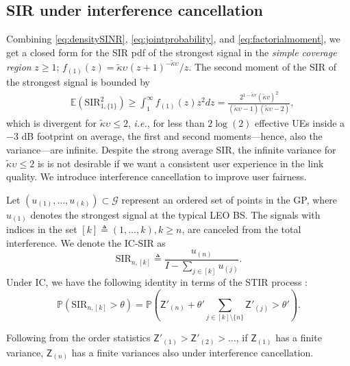 \documentclass[lettersize,journal]{IEEEtran}
\begin{document}
\subsection{SIR under interference cancellation}
Combining \eqref{eq:densitySINR}, \eqref{eq:jointprobability}, and \eqref{eq:factorialmoment}, we get a closed form for the SIR pdf of the strongest signal in the \textit{simple coverage region} $z\geq 1$; $f_{(1)}(z) =  {\tilde{\kappa}\upsilon_{}\left({z + 1} \right)^{-\tilde{\kappa}\upsilon_{}}}/{z}$. The second moment of the SIR of the strongest signal is bounded by
\begin{align}
  \label{eq:SIR2}
&\mathbb{E}(\text{SIR}^2_{1,\{1\}}) \geq \int_{1}^{\infty}f_{(1)}(z) z^2 dz = \frac{2^{1-\tilde{\kappa}v}(\tilde{\kappa}v)^2}{(\tilde{\kappa}\upsilon-1)(\tilde{\kappa}\upsilon-2)},
\end{align}
which is divergent for $\tilde{\kappa}\upsilon \leq 2$, \textit{i.e.}, for less than $2\log(2)$ effective UEs inside a $-3$ dB footprint on average, the first and second moments---hence, also the variance---are infinite. Despite the strong average SIR, the infinite variance for $\tilde{\kappa}\upsilon \leq 2$ is is not desirable if we want a consistent user experience in the link quality. We introduce interference cancellation to improve user fairness.



Let $(u_{(1)}, \dots, u_{(k)}) \subset \mathcal{G}$ represent an ordered set of points in the GP, where $u_{(1)}$ denotes the strongest signal at the typical LEO BS. The signals with indices in the set $[k] \triangleq (1,\dots,k), k\geq n$,  are canceled from the total interference. We denote the IC-SIR as
\begin{equation}
  \label{eq:IC-SINR}
  \text{SIR}_{n,[k]} \triangleq \frac{u_{(n)}}{I-\sum_{j \in [k]} u_{(j)}}.
\end{equation}
Under IC, we have the following identity in terms of the STIR process \cite[Eq. 69]{7305791}:
\begin{equation}
   \mathbb{P}(\text{SIR}_{n,[k]} > \theta) = \mathbb{P}\left(\mathsf{Z}'_{(n)}+\theta'\sum_{j\in [k] \setminus \{n\}}\mathsf{Z}'_{(j)} > \theta'\right).
\end{equation}

Following from the order statistics $\mathsf{Z}'_{(1)} > \mathsf{Z}'_{(2)} >\dots $, if $\mathsf{Z}_{(1)}$ has a finite variance, $\mathsf{Z}_{(n)}$ has a finite variances also under interference cancellation.
\end{document}
